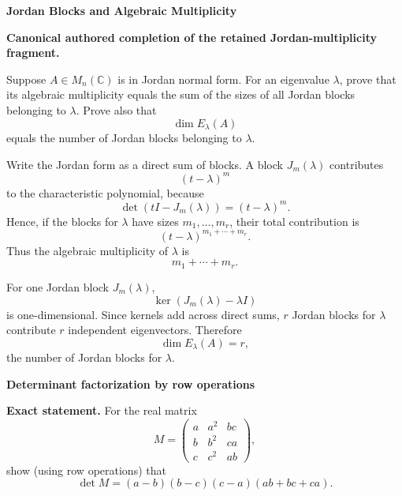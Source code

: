 \begin{problem}[CP-I-0017]
\label{prob:cp-i-0017}
\textbf{Jordan Blocks and Algebraic Multiplicity}

\textbf{Canonical authored completion of the retained Jordan-multiplicity fragment.}

\hspace*{1.5em}Suppose \(A\in M_n(\mathbb C)\) is in Jordan normal form.
For an eigenvalue \(\lambda\), prove that its algebraic multiplicity equals the sum of the sizes
of all Jordan blocks belonging to \(\lambda\). Prove also that
\[
\dim E_\lambda(A)
\]
equals the number of Jordan blocks belonging to \(\lambda\).
\end{problem}

\begin{solution}
Write the Jordan form as a direct sum of blocks. A block \(J_m(\lambda)\) contributes
\[
(t-\lambda)^m
\]
to the characteristic polynomial, because
\[
\det(tI-J_m(\lambda))=(t-\lambda)^m.
\]
Hence, if the blocks for \(\lambda\) have sizes \(m_1,\dots,m_r\), their total contribution is
\[
(t-\lambda)^{m_1+\cdots+m_r}.
\]
Thus the algebraic multiplicity of \(\lambda\) is
\[
m_1+\cdots+m_r.
\]

For one Jordan block \(J_m(\lambda)\),
\[
\ker(J_m(\lambda)-\lambda I)
\]
is one-dimensional. Since kernels add across direct sums, \(r\) Jordan blocks for \(\lambda\)
contribute \(r\) independent eigenvectors. Therefore
\[
\dim E_\lambda(A)=r,
\]
the number of Jordan blocks for \(\lambda\).
\end{solution}

\begin{problem}[CP-I-0020]
\label{prob:cp-i-0020}
\textbf{Determinant factorization by row operations}

\textbf{Exact statement.}
\hspace*{1.5em}For the real matrix
\[
M=\begin{pmatrix}
	a & a^2 & bc\\
	b & b^2 & ca\\
	c & c^2 & ab
\end{pmatrix},
\]
show (using row operations) that
\[
\det M=(a-b)(b-c)(c-a)(ab+bc+ca).
\]

\end{problem}

